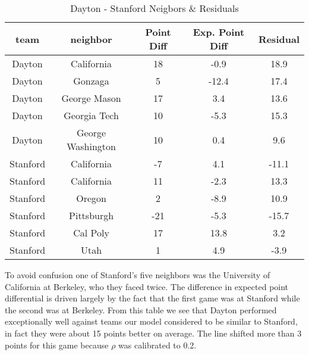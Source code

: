 \begin{table}[h!]
\caption{Dayton - Stanford Neigbors \& Residuals}
\small
\centering
\begin{tabular}{|c|cccc |}
   \hline
   \hline
 team & neighbor &  Point Diff& Exp. Point Diff & Residual \\
  \hline
Dayton & California & 18 & -0.9 & 18.9\\
Dayton & Gonzaga & 5 & -12.4 & 17.4\\
Dayton & George Mason& 17 & 3.4 & 13.6\\
Dayton &  Georgia Tech& 10 & -5.3 & 15.3\\
Dayton & George Washington& 10 & 0.4 & 9.6\\
\hline
Stanford & California&-7 & 4.1&-11.1 \\
Stanford & California &11 &-2.3 &13.3 \\
Stanford & Oregon&2 &-8.9 &10.9 \\
Stanford & Pittsburgh&-21 &-5.3 &-15.7 \\
Stanford & Cal Poly&17 &13.8 &3.2 \\
Stanford & Utah&1 &4.9 &-3.9 \\
   \hline
   \hline
\end{tabular}
\label{tab:DayStan}
\end{table}
To avoid confusion one of Stanford's five neighbors was the University of California at Berkeley, who they faced twice.  The difference in expected point differential is driven largely by the fact that the first game was at Stanford while the second was at Berkeley. From this table we see that Dayton performed exceptionally well against teams our model considered to be similar to Stanford, in fact they were about 15 points better on average. The line shifted more than 3 points for this game because $\rho$ was calibrated to 0.2.
